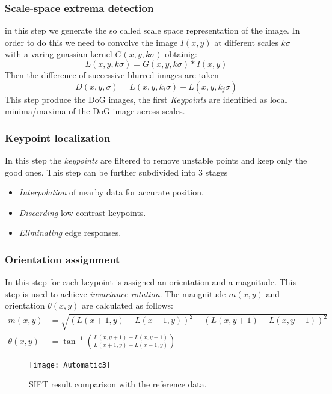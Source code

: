 \subsubsection{Scale-space extrema detection}
in this step we generate the so called
scale space representation of the image. In order to do this we need to
convolve the image $I(x,y)$ at different scales $k\sigma$ with a varing
guassian kernel $G(x,y,k\sigma)$ obtainig:
\[
    L(x,y,k\sigma) = G(x,y,k\sigma) \ast I(x,y)
\]
Then the difference of successive blurred images are taken
\[
    D(x,y,\sigma) = L(x,y,k_i\sigma) - L(x,y,k_j\sigma)
\]
This step produce the \ac{DoG} images, the first \emph{Keypoints} are identified
as local minima/maxima of the \ac{DoG} image across scales.



\subsubsection{Keypoint localization}
In this step the \emph{keypoints} are filtered
to remove unstable points and keep only the good ones. This step can be
further subdivided into 3 stages
\begin{itemize}
    \item \emph{Interpolation} of nearby data for accurate position.
    \item \emph{Discarding} low-contrast keypoints.
    \item \emph{Eliminating} edge responses.
\end{itemize}



\subsubsection{Orientation assignment}
In this step for each keypoint is assigned an
orientation and a magnitude. This step is used to achieve \emph{invariance
rotation}. The mangnitude $m(x,y)$ and orientation $\theta(x,y)$ are
calculated as follows:
\begin{equation*}
\begin{split}
    m(x,y)&=\sqrt{\left(L(x+1,y)-L(x-1,y)\right)^2+\left(L(x,y+1)-L(x,y-1)\right)^2}\\
    \theta(x,y)&=\tan^{-1}{\left(\frac{L(x,y+1)-L(x,y-1)}{L(x+1,y)-L(x-1,y)}\right)}
\end{split}
\end{equation*}

\begin{figure}[htb]
    \centering
    \texttt{[image: Automatic3]}
    \caption{\acs{SIFT} result comparison with the reference data.}
    \label{fig:Automatic3}
\end{figure}


